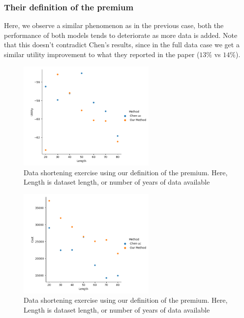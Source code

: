 \documentclass[11pt]{article}
\begin{document}
    \subsubsection{Their definition of the premium}
    Here, we observe a similar phenomenon as in the previous case, both the performance of both models tends to deteriorate as more data is added. Note that this doesn't contradict Chen's results, since in the full data case we get a similar utility improvement to what they reported in the paper ($13\%$ vs $14\%$).
    \begin{figure}[h]
        \centering
        \includegraphics[width=0.6\textwidth]{../../../output/figures/Evaluation/Utility_length_ml1241.png}
        \caption{Data shortening exercise using our definition of the premium. Here, Length is dataset length, or number of years of data available}
      \end{figure}
      \FloatBarrier

      \begin{figure}[h]
        \centering
        \includegraphics[width=0.6\textwidth]{../../../output/figures/Evaluation/Cost_length_ml1241.png}
        \caption{Data shortening exercise using our definition of the premium. Here, Length is dataset length, or number of years of data available}
      \end{figure}
      \FloatBarrier
\end{document}
